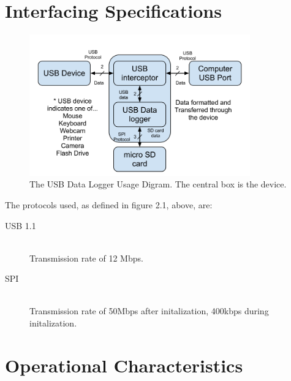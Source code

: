 \documentclass[12pt,letter,oneside]{report}
\begin{document}
\section{Interfacing Specifications}
\begin{figure}[h]
	\caption{The USB Data Logger Usage Digram. The central box is the device.}
	\begin{center}
		\includegraphics[width=0.85\textwidth]{usageDiagram}
	\end{center}
\end{figure}
The protocols used, as defined in figure 2.1, above, are:
\begin{description}
	\item[USB 1.1] \hfill \\
		Transmission rate of 12 Mbps.
	\item[SPI] \hfill \\
		Transmission rate of 50Mbps after initalization, 400kbps during initalization.
\end{description}
\pagebreak
\section{Operational Characteristics}
\end{document}
